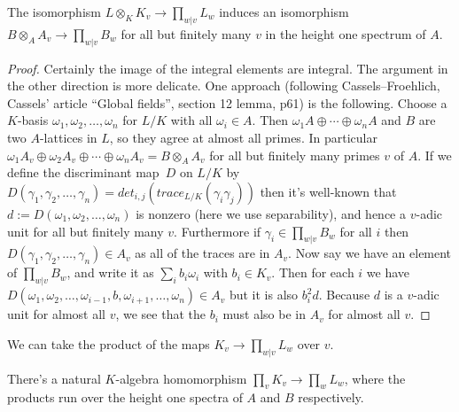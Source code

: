 \begin{theorem}
  \label{IsDedekindDomain.HeightOneSpectrum.adicCompletionComapAlgEquiv_integral}
  The isomorphism $L\otimes_KK_v\to\prod_{w|v}L_w$ induces an isomorphism
  $B\otimes_AA_v\to \prod_{w|v}B_w$
  for all but finitely many $v$ in the height one spectrum of $A$.
\end{theorem}
\begin{proof}
  Certainly the image of the integral elements are integral. The argument in the other
  direction is more delicate. One approach (following Cassels--Froehlich, Cassels' article
  ``Global fields'', section 12 lemma, p61) is the following. Choose a $K$-basis
  $\omega_1,\omega_2,\ldots,\omega_n$ for $L/K$ with all $\omega_i\in A$.
  Then $\omega_1A\oplus\cdots\oplus\omega_nA$ and
  $B$ are two $A$-lattices in $L$, so they agree at almost all primes. In particular
  $\omega_1A_v\oplus\omega_2A_v\oplus\cdots\oplus\omega_nA_v=B\otimes_AA_v$ for all but
  finitely many primes $v$ of $A$. If we define the discriminant map~$D$ on $L/K$
  by $D(\gamma_1,\gamma_2,\ldots,\gamma_n)=det_{i,j}(trace_{L/K}(\gamma_i\gamma_j))$
  then it's well-known that $d:=D(\omega_1,\omega_2,\ldots,\omega_n)$ is nonzero (here we use
  separability), and hence a $v$-adic unit for all but finitely many $v$. Furthermore if
  $\gamma_i\in \prod_{w|v}B_w$ for all $i$ then $D(\gamma_1,\gamma_2,\ldots,\gamma_n)\in A_v$
  as all of the traces are in $A_v$. Now say
  we have an element of $\prod_{w|v}B_w$, and write it as $\sum_i b_i\omega_i$ with
  $b_i\in K_v$. Then for each $i$ we have
  $D(\omega_1,\omega_2,\ldots,\omega_{i-1},b,\omega_{i+1},\ldots,\omega_n)\in A_v$
  but it is also $b_i^2d$. Because $d$ is a $v$-adic unit for almost all $v$, we
  see that the $b_i$ must also be in $A_v$ for almost all $v$.
\end{proof}

We can take the product of the maps $K_v\to\prod_{w|v}L_w$ over $v$.

\begin{definition}
  \label{DedekindDomain.ProdAdicCompletions.baseChange}
  There's a natural $K$-algebra homomorphism $\prod_v K_v\to\prod_w L_w$, where the
  products run over the height one spectra of $A$ and $B$ respectively.
\end{definition}

